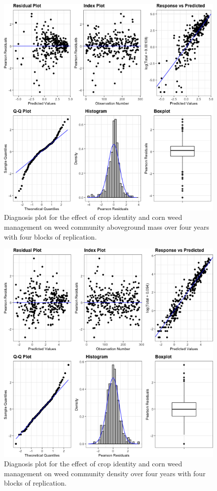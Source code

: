 \documentclass[
]{article}
\begin{document}
\begin{figure}
\centering
\includegraphics{AppendixA-model-diagnosis_files/figure-latex/all-biom-mod-1.png}
\caption{\label{fig:all-biom-mod}Diagnosis plot for the effect of crop identity and corn weed management on weed community aboveground mass over four years with four blocks of replication.}
\end{figure}

\begin{figure}
\centering
\includegraphics{AppendixA-model-diagnosis_files/figure-latex/all-dens-mod-1.png}
\caption{\label{fig:all-dens-mod}Diagnosis plot for the effect of crop identity and corn weed management on weed community density over four years with four blocks of replication.}
\end{figure}
\end{document}
